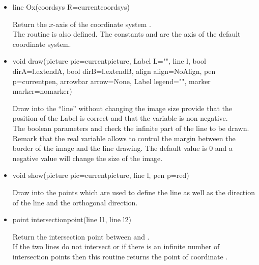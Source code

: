 \documentclass[pdftex]{article}
\begin{document}
\begin{itemize}
\item {}%
  \begin{Vcolor}
    line Ox(coordsys R=currentcoordsys)
  \end{Vcolor}
  Return the $x$-axis of the coordinate system .\\
  The routine  is also
  defined.
  The constants  and  are the axis of the default
  coordinate system.
  \item {}%
  \begin{Vcolor}
    void draw(picture pic=currentpicture, Label L="",
    line l, bool dirA=l.extendA, bool dirB=l.extendB,
    align align=NoAlign, pen p=currentpen,
    arrowbar arrow=None, Label legend="", marker marker=nomarker)
  \end{Vcolor}
  Draw into  the ``line''   without changing the
  image size provide that the position of the Label is correct and
  that the variable  is non negative.\\
    The boolean parameters  and  check the
  infinite part of the line to be drawn.\\
    Remark that the real variable  allows to control
  the margin between the border of the image and the line drawing.
  The default value is 0 and  a negative value will change the size of
  the image.
\item {}%
  \begin{Vcolor}
    void show(picture pic=currentpicture, line l, pen p=red)
  \end{Vcolor}
  Draw into  the points which are used to define the
  line  as well as the direction of the line and the
  orthogonal direction.
  \item {}%
  \begin{Vcolor}
    point intersectionpoint(line l1, line l2)
  \end{Vcolor}
  Return the intersection point between  and .\\
    If the two lines do not intersect or if there is an infinite number
  of intersection points then this routine returns the point of
  coordinate .

\end{itemize}
\end{document}
